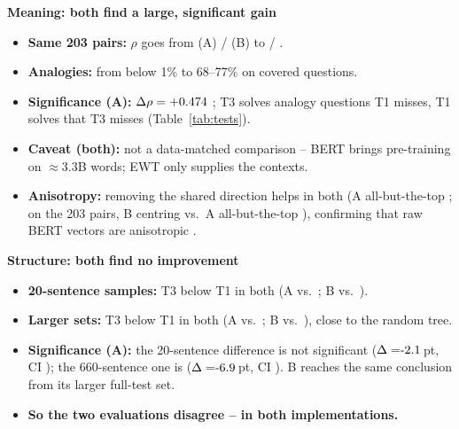 \documentclass[11pt,a4paper]{article}
\newcommand{\pt}{\,pt}
\newcommand{\blk}[1]{\par\needspace{5\baselineskip}\smallskip\noindent\textbf{#1}\par\nobreak\vspace{1pt}}
\begin{document}
\begin{table}[h]\centering\footnotesize\setlength{\tabcolsep}{4pt}
\caption{Semantic benchmarks. The ``203'' column scores every system on the same 203 pairs (A re-scored; Table~\ref{tab:cross}).
B's T1-vocabulary variants also restrict the analogy candidates to 8,865 words, which raises covered accuracy.}\label{tab:t3sem}\end{table}
\begin{table}[h]\centering\footnotesize\setlength{\tabcolsep}{4pt}
\caption{Structural check (UUAS of the cosine-distance MST). The two implementations use different sentences (Table~\ref{tab:impl}), so
compare rows within a column.}\label{tab:t3struct}\end{table}

\blk{Meaning: both find a large, significant gain}
\begin{itemize}
\item \textbf{Same 203 pairs:} $\rho$ goes from \XTOneSub{} (A) / \BWSCov{} (B) to \XTThreeSub{} / \BTSameWS.
\item \textbf{Analogies:} from below 1\% to 68--77\% on covered questions.
\item \textbf{Significance (A):} $\Delta\rho=+0.474$ \PtWSCI; T3 solves \PtANOnlyA{} analogy questions T1 misses, T1 solves \PtANOnlyB{}
that T3 misses (Table~\ref{tab:tests}).
\item \textbf{Caveat (both):} not a data-matched comparison -- BERT brings pre-training on $\approx$3.3B words; EWT only supplies the contexts.
\item \textbf{Anisotropy:} removing the shared direction helps in both (A all-but-the-top \TThreeAWSCov; on the 203 pairs, B centring
\BTCenWS{} vs.\ A all-but-the-top \XTThreeASub), confirming that raw BERT vectors are anisotropic \citep{ethayarajh}.
\end{itemize}

\blk{Structure: both find no improvement}
\begin{itemize}
\item \textbf{20-sentence samples:} T3 below T1 in both (A \TThreeMST{} vs.\ \TOneMST; B \BTSameMST{} vs.\ \BMSTTwenty).
\item \textbf{Larger sets:} T3 below T1 in both (A \TThreePool{} vs.\ \TOnePool; B \BTSameFull{} vs.\ \BMSTFull), close to the random tree.
\item \textbf{Significance (A):} the 20-sentence difference is not significant ($\Delta=\PtMSTDiff$\pt, CI \PtMSTCI); the 660-sentence one is
($\Delta=\PtPoolDiff$\pt, CI \PtPoolCI). B reaches the same conclusion from its larger full-test set.
\item \textbf{So the two evaluations disagree -- in both implementations.}
\end{itemize}
\begin{table}[h]\centering\footnotesize\setlength{\tabcolsep}{4pt}
\caption{A's paired tests on identical items (analogy: questions solved only by A / only by B, exact McNemar $p$).}\label{tab:tests}\end{table}
\end{document}

